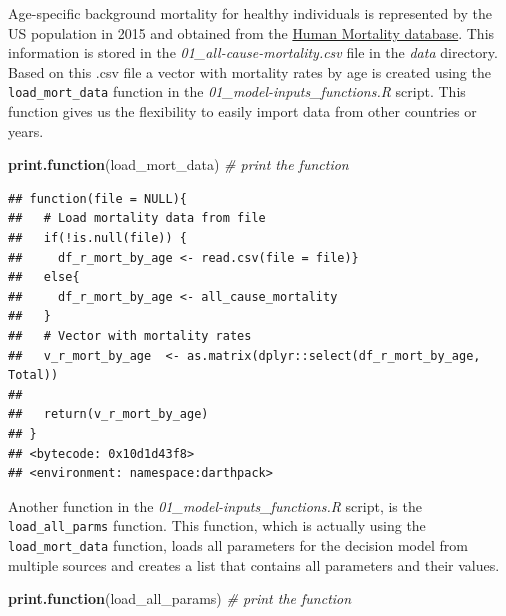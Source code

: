 \documentclass[]{book}
\newenvironment{Shaded}{\begin{snugshade}}{\end{snugshade}}
\newcommand{\KeywordTok}[1]{\textcolor[rgb]{0.13,0.29,0.53}{\textbf{#1}}}
\newcommand{\CommentTok}[1]{\textcolor[rgb]{0.56,0.35,0.01}{\textit{#1}}}
\newcommand{\NormalTok}[1]{#1}
\begin{document}
Age-specific background mortality for healthy individuals is represented
by the US population in 2015 and obtained from the
\href{https://www.mortality.org}{Human Mortality database}. This
information is stored in the \emph{01\_all-cause-mortality.csv} file in
the \emph{data} directory. Based on this .csv file a vector with
mortality rates by age is created using the \texttt{load\_mort\_data}
function in the \emph{01\_model-inputs\_functions.R} script. This
function gives us the flexibility to easily import data from other
countries or years.

\begin{Shaded}
\begin{Highlighting}[]
\KeywordTok{print.function}\NormalTok{(load_mort_data) }\CommentTok{# print the function}
\end{Highlighting}
\end{Shaded}

\begin{verbatim}
## function(file = NULL){
##   # Load mortality data from file
##   if(!is.null(file)) {
##     df_r_mort_by_age <- read.csv(file = file)}
##   else{
##     df_r_mort_by_age <- all_cause_mortality
##   }
##   # Vector with mortality rates
##   v_r_mort_by_age  <- as.matrix(dplyr::select(df_r_mort_by_age, Total))
##   
##   return(v_r_mort_by_age)
## }
## <bytecode: 0x10d1d43f8>
## <environment: namespace:darthpack>
\end{verbatim}

Another function in the \emph{01\_model-inputs\_functions.R} script, is
the \texttt{load\_all\_parms} function. This function, which is actually
using the \texttt{load\_mort\_data} function, loads all parameters for
the decision model from multiple sources and creates a list that
contains all parameters and their values.

\begin{Shaded}
\begin{Highlighting}[]
\KeywordTok{print.function}\NormalTok{(load_all_params)  }\CommentTok{# print the function}
\end{Highlighting}
\end{Shaded}
\end{document}
